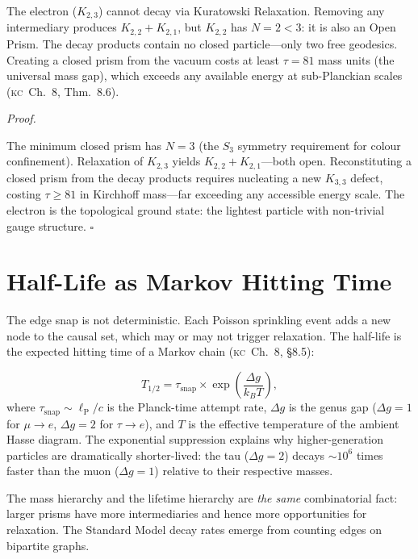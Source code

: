 \documentclass[11pt, a4paper, openany]{book}
\newcommand{\lP}{\ell_{\mathrm{P}}}
\newcommand{\KC}[1]{\textnormal{(\textsc{kc}~#1)}}
\newcounter{thm}[chapter]
\renewenvironment{proof}[1][Proof]{%
  \par\noindent\textit{#1.}\quad
}{\hfill$\square$\par\medskip}
\begin{document}
\begin{theorem}\label{thm:electron-stable}
The electron ($K_{2,3}$) cannot decay via Kuratowski Relaxation.
Removing any intermediary produces $K_{2,2} + K_{2,1}$, but $K_{2,2}$
has $N = 2 < 3$: it is also an Open Prism. The decay products contain
no closed particle---only two free geodesics. Creating a closed prism
from the vacuum costs at least $\tau = 81$ mass units (the universal
mass gap), which exceeds any available energy at sub-Planckian scales
\KC{Ch.~8, Thm.~8.6}.
\end{theorem}

\begin{proof}
The minimum closed prism has $N = 3$ (the $S_3$ symmetry requirement
for colour confinement). Relaxation of $K_{2,3}$ yields
$K_{2,2} + K_{2,1}$---both open. Reconstituting a closed prism
from the decay products requires nucleating a new $K_{3,3}$ defect,
costing $\tau \geq 81$ in Kirchhoff mass---far exceeding any
accessible energy scale.  The electron is the topological ground
state: the lightest particle with non-trivial gauge structure.
\end{proof}

\section{Half-Life as Markov Hitting Time}\label{sec:halflife}

The edge snap is not deterministic. Each Poisson sprinkling event adds a
new node to the causal set, which may or may not trigger relaxation.
The half-life is the expected hitting time of a Markov chain
\KC{Ch.~8, \S8.5}:

\begin{theorem}\label{thm:halflife}
\[
  T_{1/2} = \tau_{\mathrm{snap}} \times
  \exp\!\left(\frac{\Delta g}{k_B T}\right),
\]
where $\tau_{\mathrm{snap}} \sim \lP/c$ is the Planck-time
attempt rate, $\Delta g$ is the genus gap ($\Delta g = 1$ for
$\mu \to e$, $\Delta g = 2$ for $\tau \to e$), and $T$ is the
effective temperature of the ambient Hasse diagram. The exponential
suppression explains why higher-generation particles are dramatically
shorter-lived: the tau ($\Delta g = 2$) decays $\sim 10^6$ times
faster than the muon ($\Delta g = 1$) relative to their respective
masses.
\end{theorem}

\noindent
The mass hierarchy and the lifetime hierarchy are \emph{the same}
combinatorial fact: larger prisms have more intermediaries and hence
more opportunities for relaxation. The Standard Model decay rates
emerge from counting edges on bipartite graphs.
\end{document}
